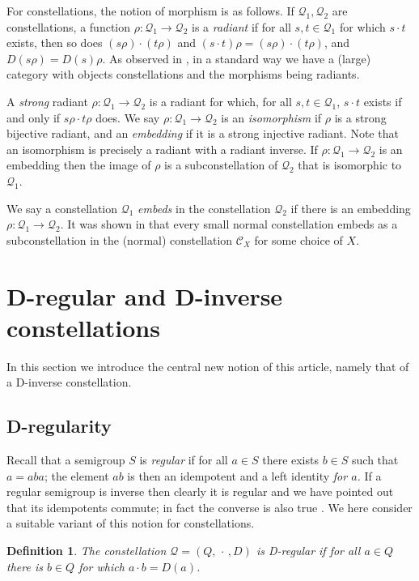 \documentclass[12pt]{amsart}
\newtheorem{dfn}[thm]{Definition}
\theoremstyle{definition}
\newcommand{\Q}{\mathcal Q}
\newcommand{\C}{\mathcal C}
\begin{document}
{For constellations, the notion of morphism is as follows.  If $\Q_1,\Q_2$ are constellations, a function $\rho:\Q_1\rightarrow \Q_2$ is a {\em radiant} if for all $s,t\in \Q_1$ for which $s\cdot t$ exists, then so does $(s\rho)\cdot (t\rho)$ and  $(s\cdot t)\rho=(s\rho)\cdot (t\rho)$, and $D(s\rho)=D(s)\rho$.  As observed in \cite{constell}, in a standard way we have a (large) category with objects constellations and the  morphisms being radiants.  

A {\em strong} radiant $\rho:\Q_1\rightarrow \Q_2$ is a radiant for which, for all $s,t\in \Q_1$, $s\cdot t$ exists if and only if $s\rho\cdot t\rho$ does.  We say $\rho:\Q_1\rightarrow \Q_2$ is an {\em isomorphism} if $\rho$ is a strong bijective radiant, and an {\em embedding} if it is a strong injective radiant. 
Note that an isomorphism is precisely a  radiant with a radiant inverse.  If $\rho:\Q_1\rightarrow \Q_2$ is an embedding then the image of $\rho$ is a subconstellation of $\Q_2$ that is isomorphic to $\Q_1$.

 We say a constellation $\Q_1$ {\em embeds} in the constellation $\Q_2$ if there is an embedding $\rho:\Q_1\rightarrow \Q_2$.   It was shown in \cite{constgen} that every small normal constellation embeds as a subconstellation in the (normal) constellation $\C_X$ for some choice of $X$.


\section{D-regular and D-inverse constellations}  \label{sec:Dreg}

In this section we introduce the central new notion of this article, namely that of a D-inverse constellation.

\subsection{D-regularity} \label{sec:regular}

Recall that a semigroup $S$ is {\em regular} if for all $a\in S$ there exists $b\in S$ such that $a=aba$; the element $ab$ is then an idempotent and a left identity {\em for $a$.} If a regular semigroup is inverse then clearly it is regular and we have pointed out that its idempotents commute; in fact the converse is also true  \cite{lawsoninverse}.  We here consider a suitable variant of this notion for constellations.

\begin{dfn}
The constellation $\Q=(Q,\, \cdot\, , D)$ is {\em D-regular} if for all $a\in Q$ there is $b\in Q$ for which $a\cdot b=D(a)$. 
\end{dfn}

}
\end{document}
